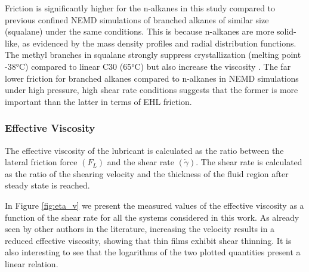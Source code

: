 \documentclass[aps,prb,reprint,superscriptaddress, a4paper]{revtex4-1}
\begin{document}
Friction is significantly higher for the n-alkanes in this study compared to previous confined NEMD simulations of branched alkanes of similar size (squalane) under the same conditions\cite{Ewen2017a}. This is because n-alkanes are more solid-like, as evidenced by the mass density profiles and radial distribution functions. The methyl branches in squalane strongly suppress crystallization (melting point -38°C) compared to linear C30 (65°C) but also increase the viscosity \cite{Jabbarzadeh2002}. The far lower friction for branched alkanes compared to n-alkanes in NEMD simulations under high pressure, high shear rate conditions suggests that the former is more important than the latter in terms of EHL friction.

\subsubsection{Effective Viscosity}

The effective viscosity of the lubricant is calculated as the ratio between the lateral friction force $\left(F_L\right)$ and the shear rate $\left(\dot{\gamma}\right)$. The shear rate is calculated as the ratio of the shearing velocity and the thickness of the fluid region after steady state is reached. 

In Figure \ref{fig:eta_v} we present the measured values of the effective viscosity as a function of the shear rate for all the systems considered in this work.   As already seen by other authors in the literature, increasing the velocity results in a reduced effective viscosity, showing that thin films exhibit shear thinning\cite{Sivebaek2012}. It is also interesting to see that the logarithms of the two plotted quantities present a linear relation.
\end{document}
